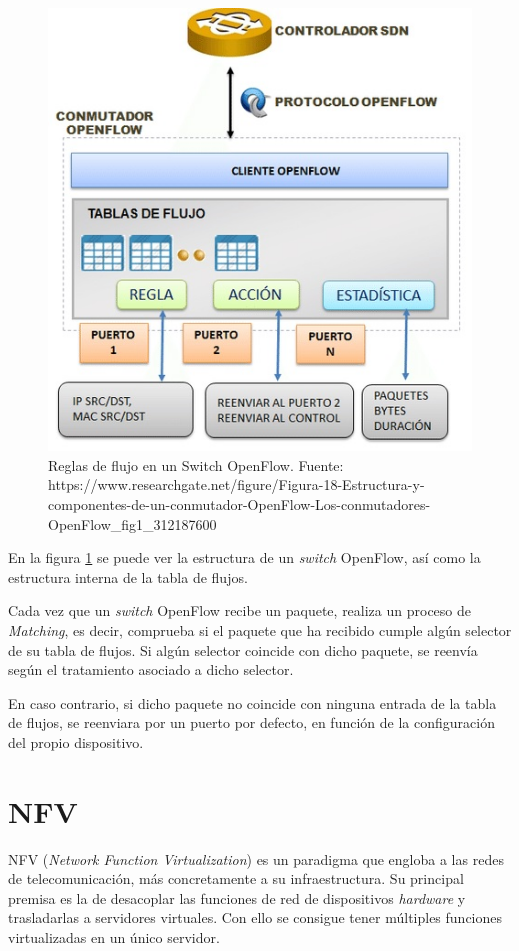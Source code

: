 \begin{figure}[!ht]
	\centering
	\includegraphics[width=0.7\linewidth]{imagenes/flujosOpenflow}
	\caption{Reglas de flujo en un Switch OpenFlow. Fuente: https://www.researchgate.net/figure/Figura-18-Estructura-y-componentes-de-un-conmutador-OpenFlow-Los-conmutadores-OpenFlow\_fig1\_312187600}
	\label{fig:flujosopenflow}
\end{figure}

\clearpage

En la figura \ref{fig:flujosopenflow} se puede ver la estructura de un \textit{switch} OpenFlow, así como la estructura interna de la tabla de flujos.

Cada vez que un \textit{switch} OpenFlow recibe un paquete, realiza un proceso de \textit{Matching}, es decir, comprueba si el paquete que ha recibido cumple algún selector de su tabla de flujos. Si algún selector coincide con dicho paquete, se reenvía según el tratamiento asociado a dicho selector.

En caso contrario, si dicho paquete no coincide con ninguna entrada de la tabla de flujos, se reenviara por un puerto por defecto, en función de la configuración del propio dispositivo.


\section{NFV}
\label{sec:nfv}

NFV (\textit{Network Function Virtualization}) es un paradigma que engloba a las redes de telecomunicación, más concretamente a su infraestructura. Su principal premisa es la de desacoplar las funciones de red de dispositivos \textit{hardware} y
 trasladarlas a servidores virtuales. Con ello se consigue tener múltiples funciones virtualizadas en un único servidor.

